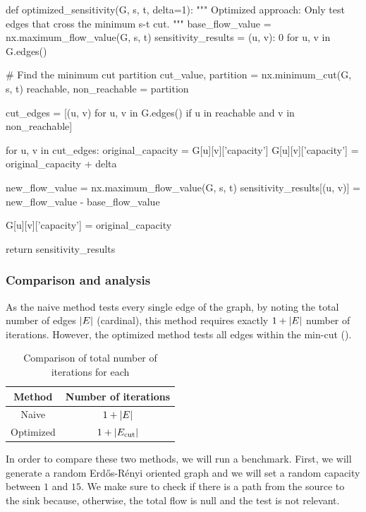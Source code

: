 \documentclass[12pt, openany]{article}
\begin{document}
\begin{python}[caption={Python code for the naive approach},  label={lst:1_optimized_method}]
def optimized_sensitivity(G, s, t, delta=1):
    """
    Optimized approach: Only test edges that cross the minimum s-t cut.
    """
    base_flow_value = nx.maximum_flow_value(G, s, t)
    sensitivity_results = { (u, v): 0 for u, v in G.edges() }
        
    # Find the minimum cut partition
    cut_value, partition = nx.minimum_cut(G, s, t)
    reachable, non_reachable = partition
    
    cut_edges = [(u, v) for u, v in G.edges() if u in reachable and v in non_reachable]
            
    for u, v in cut_edges:
        original_capacity = G[u][v]['capacity']
        G[u][v]['capacity'] = original_capacity + delta
        
        new_flow_value = nx.maximum_flow_value(G, s, t)
        sensitivity_results[(u, v)] = new_flow_value - base_flow_value
        
        G[u][v]['capacity'] = original_capacity
        
    return sensitivity_results
\end{python}

\subsubsection{Comparison and analysis}

As the naive method tests every single edge of the graph, by noting the total number of edges $\abs{E}$ (cardinal), this method requires exactly $1+\abs{E}$ number of iterations. However, the optimized method tests all edges within the min-cut ().

\begin{table}[H]
    \centering
    \begin{tabular}{c | c}
         Method & Number of iterations \\
         \hline
         Naive & $1 + \abs{E}$\\
         Optimized & $1 + \abs{E_{\text{cut}}}$
    \end{tabular}
    \caption{Comparison of total number of iterations for each}
    \label{tab:nb_iterations_methods_1}
\end{table}

In order to compare these two methods, we will run a benchmark. First, we will generate a random Erdős-Rényi oriented graph and we will set a random capacity between $1$ and $15$. We make sure to check if there is a path from the source to the sink because, otherwise, the total flow is null and the test is not relevant.
\end{document}
